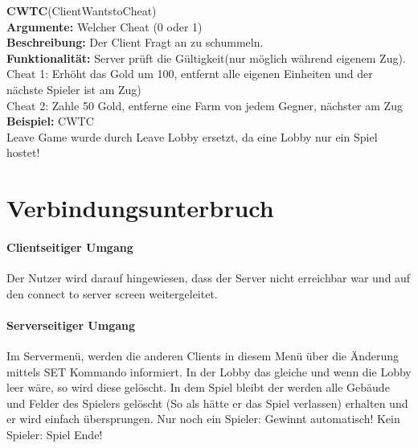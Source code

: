 \documentclass[a4paper, 12pt, oneside, headsepline=.5pt,footsepline=.5pt]{scrartcl}
\begin{document}
{\large \textbf{CWTC}(ClientWantstoCheat)} \\
\hspace{4ex} \textbf{Argumente:} {Welcher Cheat (0 oder 1)} \\
\hspace{4ex} \textbf{Beschreibung:} {Der Client Fragt an zu schummeln.} \\
\hspace{4ex} \textbf{Funktionalität:} {Server prüft die Gültigkeit(nur möglich während eigenem Zug).\\ Cheat 1: Erhöht das Gold um 100, entfernt alle eigenen Einheiten und der nächste Spieler ist am Zug)\\
Cheat 2: Zahle 50 Gold, entferne eine Farm von jedem Gegner, nächster am Zug} \\
\hspace{4ex} \textbf{Beispiel:} {CWTC} \\

Leave Game wurde durch Leave Lobby ersetzt, da eine Lobby nur ein Spiel hostet!

\section{Verbindungsunterbruch}

\paragraph{Clientseitiger Umgang}
Der Nutzer wird darauf hingewiesen, dass der Server nicht erreichbar war und auf den connect to server screen weitergeleitet.

\paragraph{Serverseitiger Umgang}
Im Servermenü, werden die anderen Clients in diesem Menü über die Änderung mittels SET Kommando informiert.
In der Lobby das gleiche und wenn die Lobby leer wäre, so wird diese gelöscht. In dem Spiel bleibt der werden alle Gebäude und Felder des Spielers gelöscht (So als hätte er das Spiel verlassen) erhalten und er wird einfach übersprungen. Nur noch ein Spieler: Gewinnt automatisch! Kein Spieler: Spiel Ende!
\end{document}
